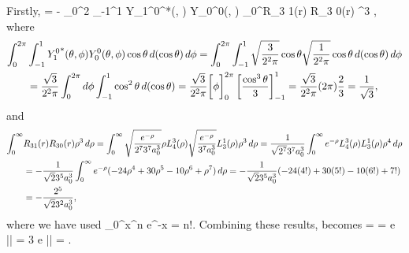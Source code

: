 \begin{solution}
	Firstly,
	\beqn \label{v1}
		 = - \int_0^{2\pi} \int_{-1}^1 {Y_1^0}^*(\tht, \phi) Y_0^0(\tht, \phi) \cos\tht \dcost \dphi \int_0^\infty R_{3 1}(r) R_{3 0}(r) \rho^3 \drho,
	\eeqn
	where
	\begin{align*}
		\int_0^{2\pi} &\int_{-1}^1 {Y_1^0}^*(\theta, \phi) Y_0^0(\theta, \phi) \cos\theta \dd{(\cos\theta)} \dd{\phi}
		= \int_0^{2\pi} \int_{-1}^1 \sqrt{\frac{3}{2^2 \pi}} \cos\theta \sqrt{\frac{1}{2^2 \pi}} \cos\theta \dd{(\cos\theta)} \dd{\phi} \\
		&= \frac{\sqrt{3}}{2^2 \pi} \int_0^{2\pi} \dd{\phi} \int_{-1}^1 \cos^2\theta \dd{(\cos\theta)}
		= \frac{\sqrt{3}}{2^2 \pi} \bigg[ \phi \bigg]_0^{2\pi} \left[ \frac{\cos^3\theta}{3} \right]_{-1}^1
		= \frac{\sqrt{3}}{2^2 \pi} (2 \pi) \frac{2}{3}
		= \frac{1}{\sqrt{3}},
	\end{align*}
	and
	\begin{align*}
		\int_0^\infty &R_{3 1}(r) R_{3 0}(r) \rho^3 \dd{\rho}
		= \int_0^\infty \sqrt{\frac{e^{-\rho}}{2^7 3^7 a_0^3}} \rho L_4^3(\rho) \sqrt{\frac{e^{-\rho}}{3^7 a_0^3}} L_3^1(\rho) \rho^3 \dd{\rho}
		= \frac{1}{\sqrt{2^7} 3^7 a_0^3} \int_0^\infty e^{-\rho} L_4^3(\rho) L_3^1(\rho) \rho^4 \dd{\rho} \\
		&= -\frac{1}{\sqrt{2} 3^5 a_0^3} \int_0^\infty e^{-\rho} (-24 \rho^4 + 30 \rho^5 - 10 \rho^6 + \rho^7) \dd{\rho}
		= -\frac{1}{\sqrt{2} 3^5 a_0^3} (-24 (4!) + 30 (5!) - 10 (6!) + 7!) \\
		&= -\frac{2^5}{\sqrt{2} 3^2 a_0^3},
	\end{align*}
	where we have used
	\beq
		\int_0^\infty x^n e^{-x}  = n!.
	\eeq
	Combining these results,  becomes
	\beq
		 =   
		= e |\vE| \ao {}
		= 3  e |\vE| \ao
		= .
	\eeq
	

\end{solution}

